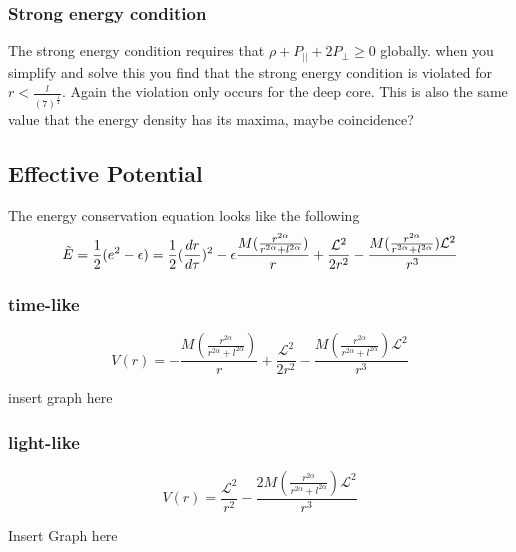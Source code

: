 \documentclass[a4paper,11pt]{article}
\begin{document}
\subsubsection{Strong energy condition}
The strong energy condition requires that $\rho+P_{||}+2P_{\bot} \geq 0$ globally.  when you simplify and solve this you find that the strong energy condition is violated for $r<\frac{l}{(7)^{\frac{1}{4}}}$. Again the violation only occurs for the deep core. This is also the same value that the energy density has its maxima, maybe coincidence?  
\pagebreak
\subsection{Effective Potential}
The energy conservation equation looks like the following
\begin{equation}
\Tilde{E}=\frac{1}{2}(e^2-\epsilon)=\frac{1}{2}(\frac{dr}{d\tau})^2-\epsilon \frac{M(\frac{r^{2 \alpha}}{r^{2 \alpha}+l^{2 \alpha}})}{r}+\frac{\mathcal{L}^2}{2r^2}-\frac{M(\frac{r^{2 \alpha}}{r^{2 \alpha}+l^{2 \alpha}})\mathcal{L}^2}{r^3}
\end{equation}



\subsubsection{time-like}
\begin{equation}
V(r)=-\frac{M(\frac{r^{2 \alpha}}{r^{2 \alpha}+l^{2 \alpha}})}{r}+\frac{\mathcal{L}^2}{2r^2}-\frac{M(\frac{r^{2 \alpha}}{r^{2 \alpha}+l^{2 \alpha}})\mathcal{L}^2}{r^3}
\end{equation}

insert graph here
\subsubsection{light-like}
\begin{equation}
V(r)=\frac{\mathcal{L}^2}{r^2}-\frac{2M(\frac{r^{2 \alpha}}{r^{2 \alpha}+l^{2 \alpha}})\mathcal{L}^2}{r^3}
\end{equation}

Insert Graph here
\end{document}
